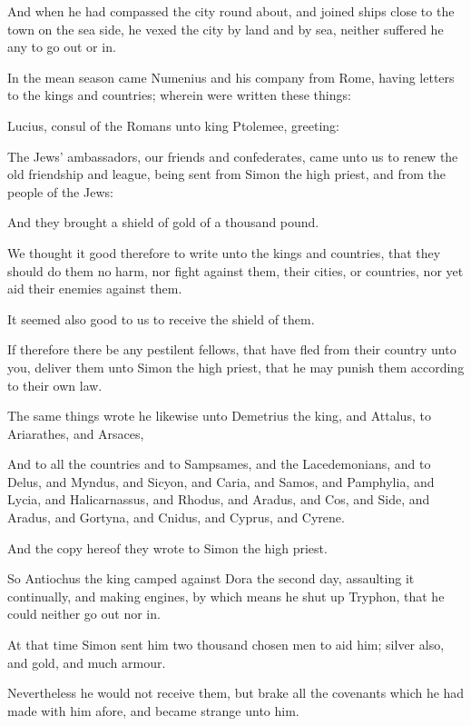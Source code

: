 {\par }{\PP {}And when he had compassed the city round about, and joined ships close to the town on the sea side, he vexed the city by land and by sea, neither suffered he any to go out or in.
\par }{\PP {}In the mean season came Numenius and his company from Rome, having letters to the kings and countries; wherein were written these things:
\par }{\PP {}Lucius, consul of the Romans unto king Ptolemee, greeting:
\par }{\PP {}The Jews’ ambassadors, our friends and confederates, came unto us to renew the old friendship and league, being sent from Simon the high priest, and from the people of the Jews:
\par }{\PP {}And they brought a shield of gold of a thousand pound.
\par }{\PP {}We thought it good therefore to write unto the kings and countries, that they should do them no harm, nor fight against them, their cities, or countries, nor yet aid their enemies against them.
\par }{\PP {}It seemed also good to us to receive the shield of them.
\par }{\PP {}If therefore there be any pestilent fellows, that have fled from their country unto you, deliver them unto Simon the high priest, that he may punish them according to their own law.
\par }{\PP {}The same things wrote he likewise unto Demetrius the king, and Attalus, to Ariarathes, and Arsaces,
\par }{\PP {}And to all the countries and to Sampsames, and the Lacedemonians, and to Delus, and Myndus, and Sicyon, and Caria, and Samos, and Pamphylia, and Lycia, and Halicarnassus, and Rhodus, and Aradus, and Cos, and Side, and Aradus, and Gortyna, and Cnidus, and Cyprus, and Cyrene.
\par }{\PP {}And the copy hereof they wrote to Simon the high priest.
\par }{\PP {}So Antiochus the king camped against Dora the second day, assaulting it continually, and making engines, by which means he shut up Tryphon, that he could neither go out nor in.
\par }{\PP {}At that time Simon sent him two thousand chosen men to aid him; silver also, and gold, and much armour.
\par }{\PP {}Nevertheless he would not receive them, but brake all the covenants which he had made with him afore, and became strange unto him.
}
